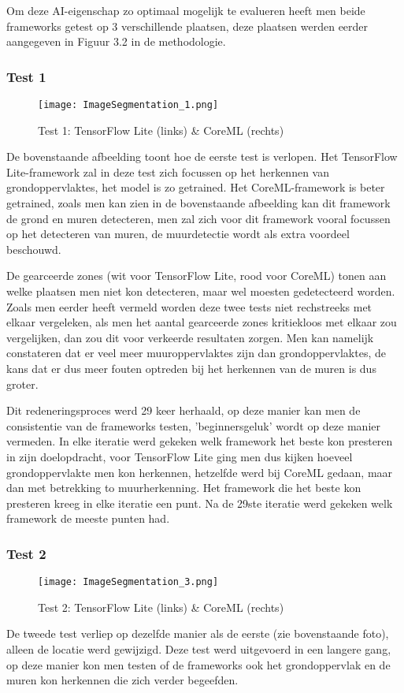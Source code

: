 Om deze AI-eigenschap zo optimaal mogelijk te evalueren heeft men beide frameworks getest op 3 verschillende plaatsen, deze plaatsen werden eerder aangegeven in Figuur 3.2 in de methodologie.

\subsubsection{Test 1}
\begin{figure}[H]
	\centering
	\texttt{[image: ImageSegmentation\_1.png]}
	\caption{Test 1: TensorFlow Lite (links) \& CoreML (rechts)}
\end{figure}

De bovenstaande afbeelding toont hoe de eerste test is verlopen. Het TensorFlow Lite-framework zal in deze test zich focussen op het herkennen van grondoppervlaktes, het model is zo getrained. Het CoreML-framework is beter getrained, zoals men kan zien in de bovenstaande afbeelding kan dit framework de grond en muren detecteren, men zal zich voor dit framework vooral focussen op het detecteren van muren, de muurdetectie wordt als extra voordeel beschouwd.

De gearceerde zones (wit voor TensorFlow Lite, rood voor CoreML) tonen aan welke plaatsen men niet kon detecteren, maar wel moesten gedetecteerd worden. Zoals men eerder heeft vermeld worden deze twee tests niet rechstreeks met elkaar vergeleken, als men het aantal gearceerde zones kritiekloos met elkaar zou vergelijken, dan zou dit voor verkeerde resultaten zorgen. Men kan namelijk constateren dat er veel meer muuroppervlaktes zijn dan grondoppervlaktes, de kans dat er dus meer fouten optreden bij het herkennen van de muren is dus groter.

Dit redeneringsproces werd 29 keer herhaald, op deze manier kan men de consistentie van de frameworks testen,  'beginnersgeluk' wordt op deze manier vermeden. In elke iteratie werd gekeken welk framework het beste kon presteren in zijn doelopdracht, voor TensorFlow Lite ging men dus kijken hoeveel grondoppervlakte men kon herkennen, hetzelfde werd bij CoreML gedaan, maar dan met betrekking to muurherkenning. Het framework die het beste kon presteren kreeg in elke iteratie een punt. Na de 29ste iteratie werd gekeken welk framework de meeste punten had.

\subsubsection{Test 2}
\begin{figure}[H]
	\centering
	\texttt{[image: ImageSegmentation\_3.png]}
	\caption{Test 2: TensorFlow Lite (links) \& CoreML (rechts)}
\end{figure}
De tweede test verliep op dezelfde manier als de eerste (zie bovenstaande foto), alleen de locatie werd gewijzigd. Deze test werd uitgevoerd in een langere gang, op deze manier kon men testen of de frameworks ook het grondoppervlak en de muren kon herkennen die zich verder begeefden. 

